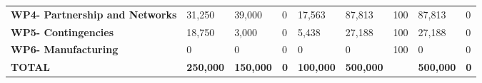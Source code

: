 \begin{landscape}
\begin{table}[H]
{\begin{tabular}{p{5cm}p{2cm}p{2cm}p{2.5cm}p{2cm}p{2cm}p{2cm}p{2cm}p{2cm}}
    \textbf{WP4- Partnership and Networks} & 31,250                                                                 & 39,000                                                             &0                                                                                 & 17,563                                                                       & 87,813                                                                                        & 100                        & 87,813                          & 0                                                                         \\
    \textbf{WP5- Contingencies}                                                        & 18,750                                                                 & 3,000                                                              &0                                                                                 & 5,438                                                                        & 27,188                                                                                        & 100                        & 27,188                          & 0                                                                         \\
    \textbf{WP6- Manufacturing}                                                        & 0                                                                      & 0                                                                  &0                                                                                 & 0                                                                            & 0                                                                                             & 100                        & 0                               & 0                                                                         \\ \hline
    \textbf{TOTAL}                                                                     & \textbf{250,000}                                                       & \textbf{150,000}                                                   & \textbf{0}                                                                      & \textbf{100,000}                                                             & \textbf{500,000}                                                                              & \textbf{}                    & \textbf{500,000}                & \textbf{0}                                                               
    \\ \bottomrule[2pt]
    \end{tabular} }
    \end{table}



\end{landscape}
